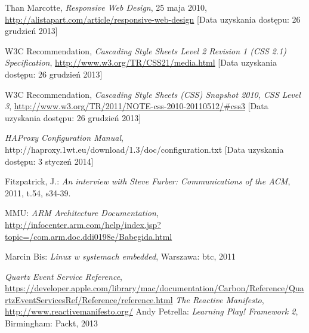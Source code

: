 \begin{thebibliography}{1}
   Than Marcotte, \emph{Responsive Web Design}, 25 maja 2010, \url{http://alistapart.com/article/responsive-web-design} [Data uzyskania dostępu: 26 grudzień 2013]

   W3C Recommendation, \emph{Cascading Style Sheets Level 2 Revision 1 (CSS 2.1) Specification}, \url{http://www.w3.org/TR/CSS21/media.html} [Data uzyskania dostępu: 26 grudzień 2013]

   W3C Recommendation, \emph{Cascading Style Sheets (CSS) Snapshot 2010, CSS Level 3}, \url{http://www.w3.org/TR/2011/NOTE-css-2010-20110512/\#css3} [Data uzyskania dostępu: 26 grudzień 2013]

   \emph{HAProxy Configuration Manual}, http://haproxy.1wt.eu/download/1.3/doc/configuration.txt [Data uzyskania dostępu: 3 styczeń 2014]

  Fitzpatrick, J.: \emph{An interview with Steve Furber: Communications of the ACM}, 2011, t.54, s34-39.
  
  MMU: \emph{ARM Architecture Documentation}, \url{http://infocenter.arm.com/help/index.jsp?topic=/com.arm.doc.ddi0198e/Babegida.html}

  Marcin Bis: \emph{Linux w systemach embedded}, Warszawa: btc, 2011

   \emph{Quartz Event Service Reference}, \url{https://developer.apple.com/library/mac/documentation/Carbon/Reference/QuartzEventServicesRef/Reference/reference.html}
   \emph{The Reactive Manifesto}, \url{http://www.reactivemanifesto.org/}
  Andy Petrella: \emph{Learning Play! Framework 2}, Birmingham: Packt, 2013 
\end{thebibliography}

\newpage
\listoftables

\listoffigures











